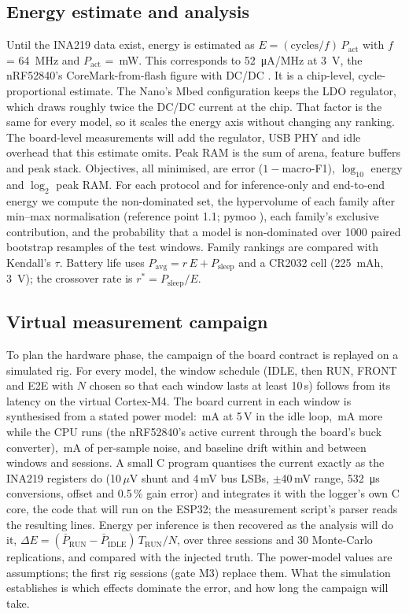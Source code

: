 \documentclass[conference]{IEEEtran}
\begin{document}
\subsection{Energy estimate and analysis}
Until the INA219 data exist, energy is estimated as $E = (\text{cycles}/f)\,P_\text{act}$ with $f$ =
\SI{64}{MHz} and $P_\text{act}$ = \NumPactmW{}\,mW. This corresponds to \SI{52}{\micro A/MHz} at \SI{3}{V}, the
nRF52840's CoreMark-from-flash figure with DC/DC \cite{nordic2021nrf52840}. It is a chip-level, cycle-proportional estimate. The Nano's Mbed
configuration keeps the LDO regulator, which draws roughly twice the DC/DC current at the chip. That factor is the
same for every model, so it scales the energy axis without changing any ranking. The board-level measurements will
add the regulator, USB PHY and idle overhead that this estimate omits. Peak RAM is the sum of arena, feature
buffers and peak stack. Objectives, all minimised, are error ($1-$macro-F1), $\log_{10}$ energy and $\log_2$ peak RAM.
For each protocol and for inference-only and end-to-end energy we compute the non-dominated set, the hypervolume of
each family after min--max normalisation (reference point 1.1; pymoo \cite{blank2020pymoo}), each family's exclusive contribution, and the
probability that a model is non-dominated over 1000 paired bootstrap resamples of the test windows. Family rankings
are compared with Kendall's $\tau$. Battery life uses $P_\text{avg} = r\,E + P_\text{sleep}$ and a CR2032 cell
(225~mAh, 3~V); the crossover rate is $r^\ast = P_\text{sleep}/E$.

\subsection{Virtual measurement campaign}
\label{sec:vrig}
To plan the hardware phase, the campaign of the board contract is replayed on a simulated rig. For every model, the
window schedule (IDLE, then RUN, FRONT and E2E with $N$ chosen so that each window lasts at least 10\,s) follows from
its latency on the virtual Cortex-M4. The board current in each window is synthesised from a stated power model:
\NumVrigIdleMa{}\,mA at 5\,V in the idle loop, \NumVrigActiveMa{}\,mA more while the CPU runs (the nRF52840's
active current through the board's buck converter), \NumVrigNoiseMa{}\,mA of per-sample noise, and baseline drift
within and between windows and sessions. A small C program quantises the current exactly as the INA219 registers do
(10\,$\mu$V shunt and 4\,mV bus LSBs, $\pm$40\,mV range, \SI{532}{\micro s} conversions, offset and 0.5\,\% gain
error) and integrates it with the logger's own C core, the code that will run on the ESP32; the measurement script's
parser reads the resulting lines. Energy per inference is then recovered as the analysis will do it,
$\Delta E = (\bar P_\text{RUN} - \bar P_\text{IDLE})\,T_\text{RUN}/N$, over three sessions and 30 Monte-Carlo replications,
and compared with the injected truth. The power-model values are assumptions; the first rig sessions (gate M3) replace
them. What the simulation establishes is which effects dominate the error, and how long the campaign will take.
\end{document}
